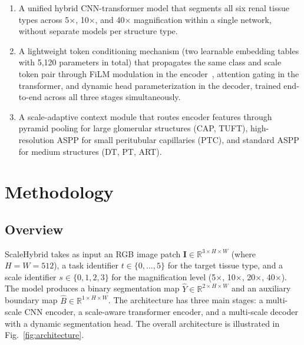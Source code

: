 \documentclass[runningheads]{llncs}
\begin{document}
\begin{enumerate}
    \item A unified hybrid CNN-transformer model that segments all six renal tissue types across 5$\times$, 10$\times$, and 40$\times$ magnification within a single network, without separate models per structure type.
    \item A lightweight token conditioning mechanism (two learnable embedding tables with 5,120 parameters in total) that propagates the same class and scale token pair through FiLM modulation in the encoder~\cite{perez2018film}, attention gating in the transformer, and dynamic head parameterization in the decoder, trained end-to-end across all three stages simultaneously.
    \item A scale-adaptive context module that routes encoder features through pyramid pooling for large glomerular structures (CAP, TUFT), high-resolution ASPP for small peritubular capillaries (PTC), and standard ASPP for medium structures (DT, PT, ART).
\end{enumerate}


\section{Methodology}

\subsection{Overview}

ScaleHybrid takes as input an RGB image patch $\mathbf{I} \in \mathbb{R}^{3 \times H \times W}$ (where $H = W = 512$), a task identifier $t \in \{0, \ldots, 5\}$ for the target tissue type, and a scale identifier $s \in \{0, 1, 2, 3\}$ for the magnification level (5$\times$, 10$\times$, 20$\times$, 40$\times$). The model produces a binary segmentation map $\hat{Y} \in \mathbb{R}^{2 \times H \times W}$ and an auxiliary boundary map $\hat{B} \in \mathbb{R}^{1 \times H \times W}$. The architecture has three main stages: a multi-scale CNN encoder, a scale-aware transformer encoder, and a multi-scale decoder with a dynamic segmentation head. The overall architecture is illustrated in Fig.~\ref{fig:architecture}.
\end{document}

